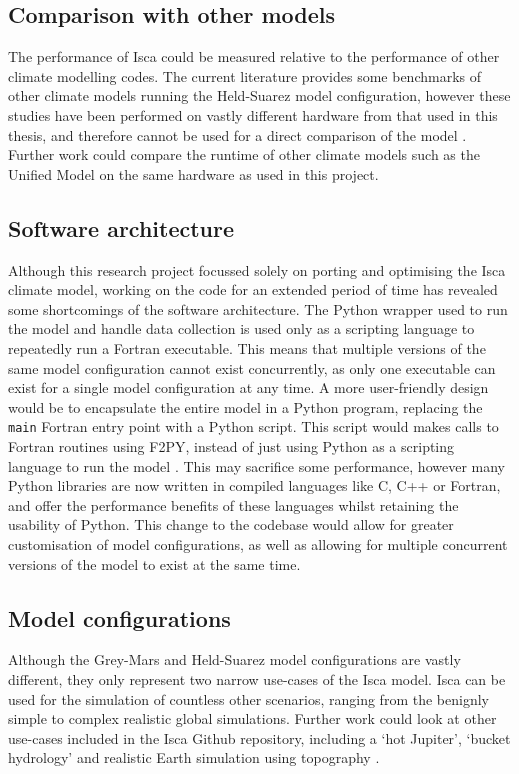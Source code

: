 \documentclass[a4paper,11pt]{report}
\begin{document}
\subsection{Comparison with other models}
The performance of Isca could be measured relative to the performance of other climate modelling codes. The current literature provides some benchmarks of other climate models running the Held-Suarez model configuration, however these studies have been performed on vastly different hardware from that used in this thesis, and therefore cannot be used for a direct comparison of the model \cite{schmidt2007benchmark}. Further work could compare the runtime of other climate models such as the Unified Model on the same hardware as used in this project.

\subsection{Software architecture}
Although this research project focussed solely on porting and optimising the Isca climate model, working on the code for an extended period of time has revealed some shortcomings of the software architecture. The Python wrapper used to run the model and handle data collection is used only as a scripting language to repeatedly run a Fortran executable. This means that multiple versions of the same model configuration cannot exist concurrently, as only one executable can exist for a single model configuration at any time. A more user-friendly design would be to encapsulate the entire model in a Python program, replacing the \texttt{main} Fortran entry point with a Python script. This script would makes calls to Fortran routines using F2PY, instead of just using Python as a scripting language to run the model \cite{peterson2009f2py}. This may sacrifice some performance, however many Python libraries are now written in compiled languages like C, C++ or Fortran, and offer the performance benefits of these languages whilst retaining the usability of Python. This change to the codebase would allow for greater customisation of model configurations, as well as allowing for multiple concurrent versions of the model to exist at the same time. 

\subsection{Model configurations}
Although the Grey-Mars and Held-Suarez model configurations are vastly different, they only represent two narrow use-cases of the Isca model. Isca can be used for the simulation of countless other scenarios, ranging from the benignly simple to complex realistic global simulations. Further work could look at other use-cases included in the Isca Github repository, including a `hot Jupiter', `bucket hydrology' and realistic Earth simulation using topography \cite{isca2019github}. 
\end{document}
